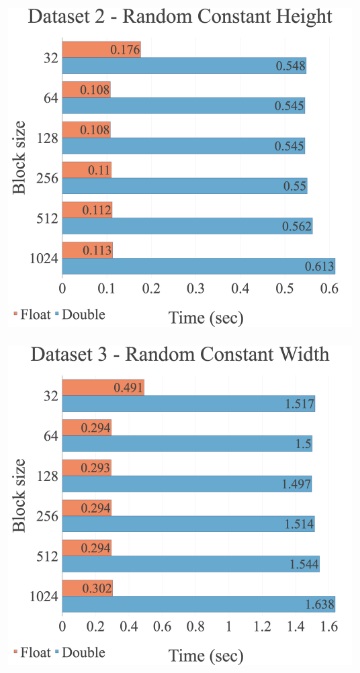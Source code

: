 \begin{figure}[H]
\begin{adjustwidth}{-2cm}{-2cm}
\begin{subfigure}{.62\textwidth}
\end{subfigure}
\par\bigskip
\par\bigskip
\begin{subfigure}{.62\textwidth}
  \centering
  \includegraphics[width=1\textwidth]{img/experiments/option-blocks-2_RANDCONSTHEIGHT.png}
\end{subfigure}
\begin{subfigure}{.62\textwidth}
  \centering
  \includegraphics[width=1\textwidth]{img/experiments/option-blocks-3_RANDCONSTWIDTH.png}
\end{subfigure}
\end{adjustwidth}
\end{figure}

